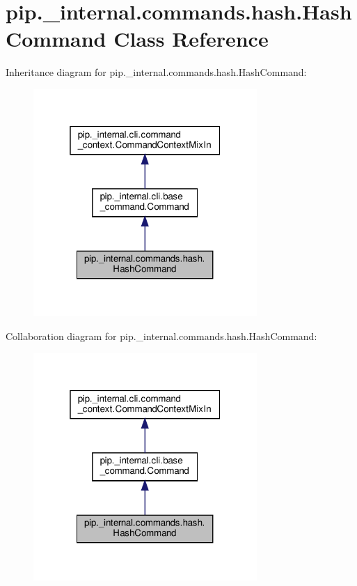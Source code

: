 \hypertarget{classpip_1_1__internal_1_1commands_1_1hash_1_1HashCommand}{}\section{pip.\+\_\+internal.\+commands.\+hash.\+Hash\+Command Class Reference}
\label{classpip_1_1__internal_1_1commands_1_1hash_1_1HashCommand}


Inheritance diagram for pip.\+\_\+internal.\+commands.\+hash.\+Hash\+Command\+:
\nopagebreak
\begin{figure}[H]
\begin{center}
\leavevmode
\includegraphics[width=241pt]{classpip_1_1__internal_1_1commands_1_1hash_1_1HashCommand__inherit__graph}
\end{center}
\end{figure}


Collaboration diagram for pip.\+\_\+internal.\+commands.\+hash.\+Hash\+Command\+:
\nopagebreak
\begin{figure}[H]
\begin{center}
\leavevmode
\includegraphics[width=241pt]{classpip_1_1__internal_1_1commands_1_1hash_1_1HashCommand__coll__graph}
\end{center}
\end{figure}

